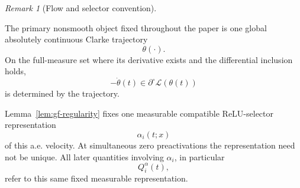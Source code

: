 \documentclass{article} %
\theoremstyle{plain}
\theoremstyle{definition}
\theoremstyle{remark}
\newtheorem{remark}[theorem]{Remark}
\begin{document}

\begin{remark}[Flow and selector convention]
\label{rem:gf-selector-convention}

The primary nonsmooth object fixed throughout the paper is one global
absolutely continuous Clarke trajectory
\[
\theta(\cdot).
\]
On the full-measure set where its derivative exists and the differential
inclusion holds,
\[
-\dot\theta(t)
\in
\partial^\circ\mathcal L(\theta(t))
\]
is determined by the trajectory.

Lemma~\ref{lem:gf-regularity} fixes one measurable compatible ReLU-selector
representation
\[
\alpha_i(t;x)
\]
of this a.e. velocity. At simultaneous zero preactivations the representation
need not be unique. All later quantities involving $\alpha_i$, in particular
\[
Q_i^\alpha(t),
\]
refer to this same fixed measurable representation.
\end{remark}


\end{document}

